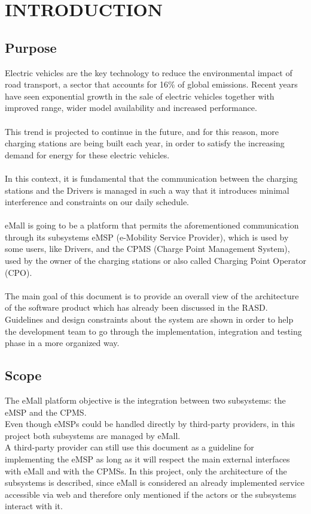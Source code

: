 \newcommand\row{\stepcounter{row}\arabic{row}}
\chapter{INTRODUCTION}
\label{ch:introduction}%

\section{Purpose}
Electric vehicles are the key technology to reduce the environmental impact of road transport, a sector that accounts for 16\% of global emissions. Recent years have seen exponential growth in the sale of electric vehicles together with improved range, wider model availability and increased performance. \\ \\
This trend is projected to continue in the future, and for this reason, more charging stations are being built each year, in order to satisfy the increasing demand for energy for these electric vehicles. \\ \\
In this context, it is fundamental that the communication between the charging stations and the Drivers is managed in such a way that it introduces minimal interference and constraints on 
our daily schedule.\\ \\
eMall is going to be a platform that permits the aforementioned communication through its subsystems eMSP (e-Mobility Service Provider), which is used by some users, like Drivers, and the CPMS (Charge Point Management System), used by the owner of the charging stations or also called Charging Point Operator (CPO).\\ \\
The main goal of this document is to provide an overall view of the architecture of the software product which has already been discussed in the RASD. Guidelines and design constraints about the system are shown in order to help the development team to go through the implementation, integration and testing phase in a more organized way.
\label{sec:purpose}
\newpage
\section{Scope}
\label{sec:scope}
The eMall platform objective is the integration between two subsystems: the eMSP and the CPMS. \\
Even though eMSPs could be handled directly by third-party providers, in this project both subsystems are managed by eMall. \\
A third-party provider can still use this document as a guideline for implementing the eMSP as long as it will respect the main external interfaces with eMall and with the CPMSs. \newline
In this project, only the architecture of the subsystems is described, since eMall is considered an already implemented service accessible via web and therefore only mentioned if the actors or the subsystems interact with it.

